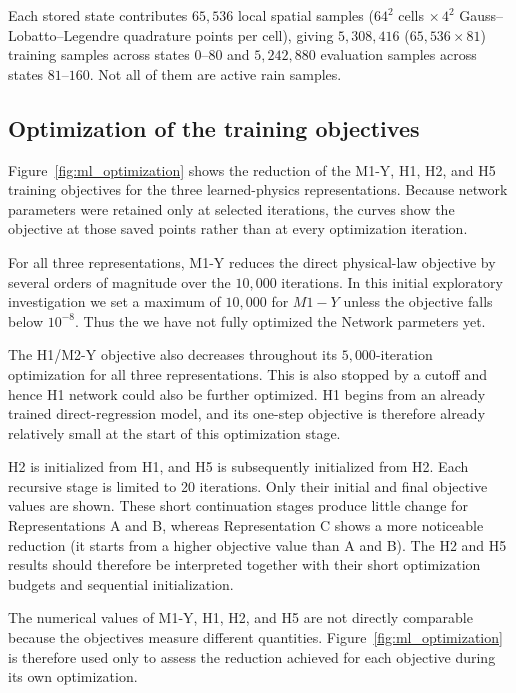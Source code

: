 \documentclass[12pt]{article}
\begin{document}
Each stored state contributes $65{,}536$ local spatial samples
($64^2$ cells $\times\,4^2$ Gauss--Lobatto--Legendre quadrature points per
cell), giving $5{,}308{,}416$ ($65{,}536\times 81$) training samples across states $0$--$80$ and
$5{,}242{,}880$ evaluation samples across states $81$--$160$. Not all of them are active rain samples.

\subsection{Optimization of the training objectives}

Figure~\ref{fig:ml_optimization} shows the reduction of the M1-Y, H1,
H2, and H5 training objectives for the three learned-physics
representations. Because network parameters were retained only at selected
iterations, the curves show the objective at those saved points rather than
at every optimization iteration.

For all three representations, M1-Y reduces the direct physical-law
objective by several orders of magnitude over the $10{,}000$
iterations. In this initial exploratory investigation we set a maximum of $10{,}000$ for $M1-Y$ unless the objective falls below $10^{-8}$. Thus the we have not fully optimized the Network parmeters yet.

The H1/M2-Y objective also decreases throughout its $5{,}000$-iteration
optimization for all three representations. This is also stopped by a cutoff and hence H1 network could also be further optimized. H1 begins from an already trained
direct-regression model, and its one-step objective is therefore already
relatively small at the start of this optimization stage.

H2 is initialized from H1, and H5 is subsequently initialized from H2.
Each recursive stage is limited to 20 iterations. Only their initial and
final objective values are shown. These short continuation stages produce
little change for Representations A and B, whereas Representation C shows a
more noticeable reduction (it starts from a higher objective value than A and B). The H2 and H5 results should therefore be
interpreted together with their short optimization budgets and sequential
initialization.

The numerical values of M1-Y, H1, H2, and H5 are not directly comparable
because the objectives measure different quantities. Figure~\ref{fig:ml_optimization}
is therefore used only to assess the reduction achieved for each objective
during its own optimization.
\end{document}
